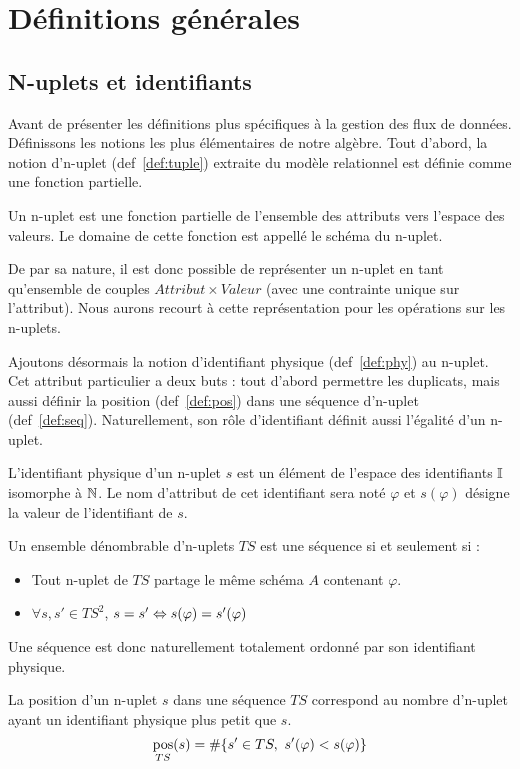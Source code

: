 \section{Définitions générales}
\subsection{N-uplets et identifiants}
Avant de présenter les définitions plus spécifiques à la gestion des flux de données. Définissons les notions les plus élémentaires de notre algèbre. Tout d'abord, la notion d'n-uplet (def~\ref{def:tuple}) extraite du modèle relationnel est définie comme une fonction partielle.
\begin{defi}[n-uplet]\label{def:tuple}
    Un n-uplet est une fonction partielle de l'ensemble des attributs vers l'espace des valeurs. Le domaine de cette fonction est appellé le schéma du n-uplet.
\end{defi}

De par sa nature, il est donc possible de représenter un n-uplet en tant qu'ensemble de couples $Attribut\times Valeur$ (avec une contrainte unique sur l'attribut). Nous aurons recourt à cette représentation pour les opérations sur les n-uplets.

Ajoutons désormais la notion d'identifiant physique (def~\ref{def:phy}) au n-uplet. Cet attribut particulier a deux buts : tout d'abord permettre les duplicats, mais aussi définir la position (def~\ref{def:pos}) dans une séquence d'n-uplet (def~\ref{def:seq}). Naturellement, son rôle d'identifiant définit aussi l'égalité d'un n-uplet.
\begin{defi}\label{def:phy}
    L'identifiant physique d'un n-uplet $s$ est un élément de l'espace des identifiants $\mathbb{I}$ isomorphe à $\mathbb{N}$. Le nom d'attribut de cet identifiant sera noté $\varphi$ et $s(\varphi)$ désigne la valeur de l'identifiant de $s$.
\end{defi}
\begin{defi}\label{def:seq}
    Un ensemble dénombrable d'n-uplets $TS$ est une séquence si et seulement si : 
    \begin{itemize}
     \item Tout n-uplet de $TS$ partage le même schéma $A$ contenant $\varphi$.
     \item $\forall s,s' \in TS^2$, $s = s' \Leftrightarrow s(\varphi) = s'(\varphi)$
    \end{itemize}

    Une séquence est donc naturellement totalement ordonné par son identifiant physique.
\end{defi}
\begin{defi}\label{def:pos}
    La position d'un n-uplet $s$ dans une séquence $TS$ correspond au nombre d'n-uplet ayant un identifiant physique plus petit que $s$.
    $$\mathop{\mathrm{pos}}_{TS}(s) = \#\{s'\in TS,\ s'(\varphi) < s(\varphi) \}$$
\end{defi}

